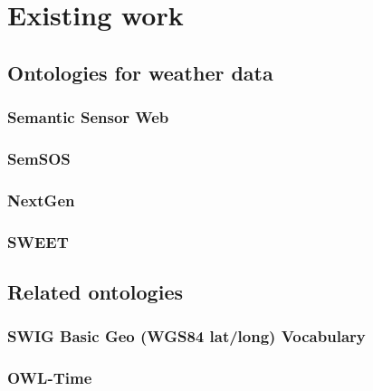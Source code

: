 \chapter{Existing work}
\label{ch:existing_work}

\section{Ontologies for weather data}

\subsection{Semantic Sensor Web}

\subsection{SemSOS}

\subsection{NextGen}

\subsection{SWEET}

\section{Related ontologies}

\subsection{SWIG Basic Geo (WGS84 lat/long) Vocabulary}

\subsection{OWL-Time}

